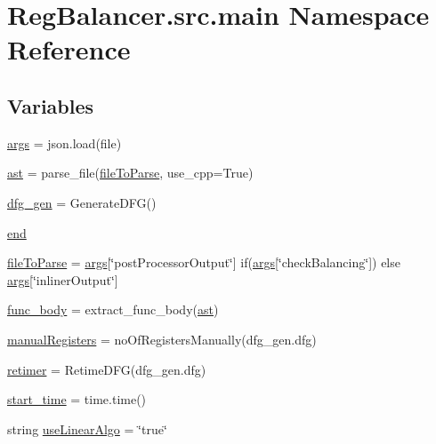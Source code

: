 \hypertarget{namespaceRegBalancer_1_1src_1_1main}{}\section{Reg\+Balancer.\+src.\+main Namespace Reference}
\label{namespaceRegBalancer_1_1src_1_1main}
\subsection*{Variables}
\begin{DoxyCompactItemize}
\item 
\hyperlink{namespaceRegBalancer_1_1src_1_1main_a8187411843a6284ffb964ef3fb9fcab3}{args} = json.\+load(file)
\item 
\hyperlink{namespaceRegBalancer_1_1src_1_1main_a83d838e3813fb5999c0492e0d9474bd9}{ast} = parse\+\_\+file(\hyperlink{namespaceRegBalancer_1_1src_1_1main_a7b981d9b48acf5de0d1fefa71978ce4a}{file\+To\+Parse}, use\+\_\+cpp=True)
\item 
\hyperlink{namespaceRegBalancer_1_1src_1_1main_aa5d70a518fbbc3f1e03d57deb06db2e4}{dfg\+\_\+gen} = Generate\+D\+FG()
\item 
\hyperlink{namespaceRegBalancer_1_1src_1_1main_afb358f48b1646c750fb9da6c6585be2b}{end}
\item 
\hyperlink{namespaceRegBalancer_1_1src_1_1main_a7b981d9b48acf5de0d1fefa71978ce4a}{file\+To\+Parse} = \hyperlink{namespaceRegBalancer_1_1src_1_1main_a8187411843a6284ffb964ef3fb9fcab3}{args}\mbox{[}\char`\"{}post\+Processor\+Output\char`\"{}\mbox{]} if(\hyperlink{namespaceRegBalancer_1_1src_1_1main_a8187411843a6284ffb964ef3fb9fcab3}{args}\mbox{[}\char`\"{}check\+Balancing\char`\"{}\mbox{]}) else \hyperlink{namespaceRegBalancer_1_1src_1_1main_a8187411843a6284ffb964ef3fb9fcab3}{args}\mbox{[}\char`\"{}inliner\+Output\char`\"{}\mbox{]}
\item 
\hyperlink{namespaceRegBalancer_1_1src_1_1main_a6f1918359d19ff0f2ae80e155c83c951}{func\+\_\+body} = extract\+\_\+func\+\_\+body(\hyperlink{namespaceRegBalancer_1_1src_1_1main_a83d838e3813fb5999c0492e0d9474bd9}{ast})
\item 
\hyperlink{namespaceRegBalancer_1_1src_1_1main_aa9c65458d6900b176c9ff9b1ef34bed0}{manual\+Registers} = no\+Of\+Registers\+Manually(dfg\+\_\+gen.\+dfg)
\item 
\hyperlink{namespaceRegBalancer_1_1src_1_1main_a1209559bbc0dbee87e2e3044b791a287}{retimer} = Retime\+D\+FG(dfg\+\_\+gen.\+dfg)
\item 
\hyperlink{namespaceRegBalancer_1_1src_1_1main_a2530c3908f0179486a4c2255f792e27a}{start\+\_\+time} = time.\+time()
\item 
string \hyperlink{namespaceRegBalancer_1_1src_1_1main_a8feea255809654e1028144a6b312c9e8}{use\+Linear\+Algo} = \char`\"{}true\char`\"{}
\end{DoxyCompactItemize}


